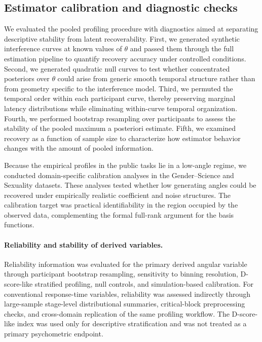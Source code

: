\documentclass[12pt]{article}
\begin{document}
\subsection{Estimator calibration and diagnostic checks}

We evaluated the pooled profiling procedure with diagnostics aimed at separating descriptive stability from latent recoverability. First, we generated synthetic interference curves at known values of $\theta$ and passed them through the full estimation pipeline to quantify recovery accuracy under controlled conditions. Second, we generated quadratic null curves to test whether concentrated posteriors over $\theta$ could arise from generic smooth temporal structure rather than from geometry specific to the interference model. Third, we permuted the temporal order within each participant curve, thereby preserving marginal latency distributions while eliminating within-curve temporal organization. Fourth, we performed bootstrap resampling over participants to assess the stability of the pooled maximum a posteriori estimate. Fifth, we examined recovery as a function of sample size to characterize how estimator behavior changes with the amount of pooled information.

Because the empirical profiles in the public tasks lie in a low-angle regime, we conducted domain-specific calibration analyses in the Gender--Science and Sexuality datasets. These analyses tested whether low generating angles could be recovered under empirically realistic coefficient and noise structures. The calibration target was practical identifiability in the region occupied by the observed data, complementing the formal full-rank argument for the basis functions.

\paragraph{Reliability and stability of derived variables.}
Reliability information was evaluated for the primary derived angular variable through
participant bootstrap resampling, sensitivity to binning resolution, D-score-like stratified
profiling, null controls, and simulation-based calibration. For conventional response-time
variables, reliability was assessed indirectly through large-sample stage-level distributional
summaries, critical-block preprocessing checks, and cross-domain replication of the same
profiling workflow. The D-score-like index was used only for descriptive stratification and
was not treated as a primary psychometric endpoint.
\end{document}
